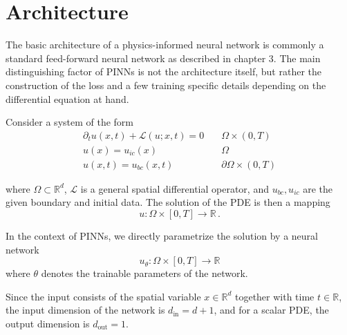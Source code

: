\section{Architecture}
%
%
%

The basic architecture of a physics-informed neural network
is commonly a standard feed-forward neural network as described in chapter 3.
The main distinguishing factor of PINNs is not the architecture itself,
but rather the construction of the loss and a few training specific details
depending on the differential equation at hand.

Consider a system of the form
\begin{align}
\partial_t u(x,t) + \mathcal L(u;x,t) = 0& \quad\Omega\times(0,T)\\
u(x) = u_{ic}(x)& \quad\Omega\\
u(x,t) = u_{bc}(x,t)& \quad\partial\Omega\times(0,T)
\end{align}

where
$\Omega\subset\mathbb R^d$,
$\mathcal L$ is a general spatial differential operator, and $u_{bc}, u_{ic}$ are the given boundary and initial data.
The solution of the PDE is then a mapping
$$
u: \Omega \times [0,T] \to \mathbb{R} \,.
$$

In the context of PINNs, we directly parametrize the solution by a neural network
$$
u_\theta : \Omega \times [0,T] \to \mathbb{R}
$$
where $\theta$ denotes the trainable parameters of the network.

Since the input consists of the spatial variable $x \in \mathbb{R}^d$ together with time $t \in \mathbb{R}$, the input dimension of the network is
$d_{\mathrm{in}} = d + 1$, and for a scalar PDE, the output dimension is $d_{\mathrm{out}} = 1$.


